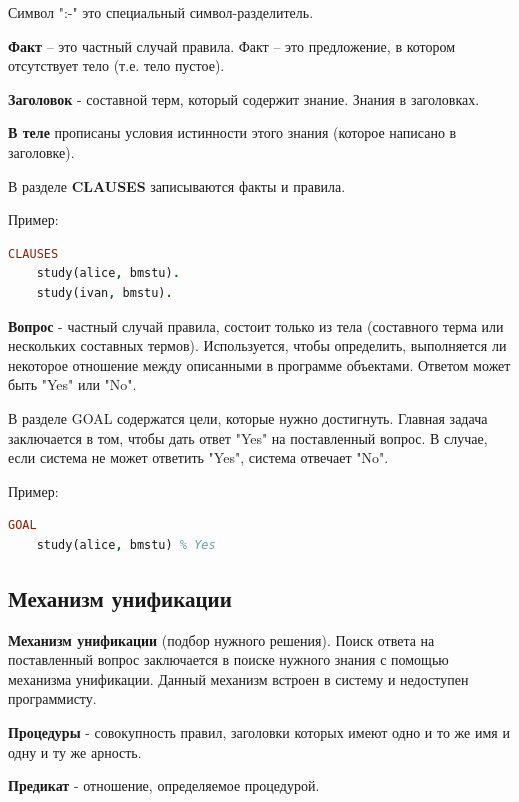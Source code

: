 \documentclass[a4paper,oneside,12pt]{extreport}
\begin{document}
Символ ":-" это специальный символ-разделитель.

\textbf{Факт} – это частный случай правила. Факт – это предложение, в котором отсутствует тело
(т.е. тело пустое). 

\textbf{Заголовок} - составной терм, который содержит знание. Знания в заголовках.

\textbf{В теле} прописаны условия истинности этого знания (которое написано в заголовке).

В разделе \textbf{CLAUSES} записываются факты и правила.

Пример:

\begin{lstlisting}[language=Prolog]
CLAUSES
    study(alice, bmstu).
    study(ivan, bmstu).
\end{lstlisting}
    
\textbf{Вопрос} - частный случай правила, состоит только из тела (составного терма или нескольких составных термов).
Используется, чтобы определить, выполняется ли некоторое отношение между описанными в программе объектами.
Ответом может быть "Yes" или "No".

В разделе GOAL содержатся цели, которые нужно достигнуть. 
Главная задача заключается в том, чтобы дать ответ "Yes" на поставленный вопрос.
В случае, если система не может ответить "Yes", система отвечает "No".

Пример:
\begin{lstlisting}[language=Prolog]
GOAL
    study(alice, bmstu) % Yes
\end{lstlisting}


\subsection*{Механизм унификации}
\textbf{Механизм унификации} (подбор нужного решения).
Поиск ответа на поставленный вопрос заключается в поиске нужного знания с помощью механизма унификации. Данный механизм встроен в систему и недоступен программисту.

\textbf{Процедуры} - совокупность правил, заголовки которых имеют одно и то же имя и одну и ту же арность.

\textbf{Предикат} - отношение, определяемое процедурой.
\end{document}
